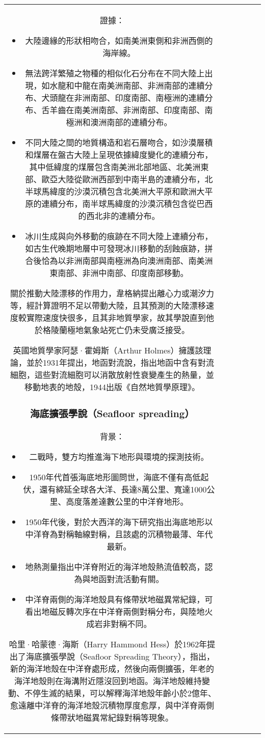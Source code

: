 \documentclass[a4paper,12pt]{report}
\begin{document}
\begin{tabular}{|c|c|c|c|c|c|}
證據：
\begin{itemize}
\item 大陸邊緣的形狀相吻合，如南美洲東側和非洲西側的海岸線。
\item 無法跨洋繁殖之物種的相似化石分布在不同大陸上出現，如水龍和中龍在南美洲南部、非洲南部的連續分布、犬頭龍在非洲南部、印度南部、南極洲的連續分布、舌羊齒在南美洲南部、非洲南部、印度南部、南極洲和澳洲南部的連續分布。
\item 不同大陸之間的地質構造和岩石層吻合，如沙漠層積和煤層在盤古大陸上呈現依據緯度變化的連續分布，其中低緯度的煤層包含南美洲北部地區、北美洲東部、歐亞大陸從歐洲西部到中南半島的連續分布，北半球馬緯度的沙漠沉積包含北美洲大平原和歐洲大平原的連續分布，南半球馬緯度的沙漠沉積包含從巴西的西北非的連續分布。
\item 冰川生成與向外移動的痕跡在不同大陸上連續分布，如古生代晚期地層中可發現冰川移動的刮蝕痕跡，拼合後恰為以非洲南部與南極洲為向澳洲南部、南美洲東南部、非洲中南部、印度南部移動。
\end{itemize}
關於推動大陸漂移的作用力，韋格納提出離心力或潮汐力等，經計算證明不足以帶動大陸，且其預測的大陸漂移速度較實際速度快很多，且其非地質學家，故其學說直到他於格陵蘭極地氣象站死亡仍未受廣泛接受。

英國地質學家阿瑟·霍姆斯（Arthur Holmes）擁護該理論，並於1931年提出，地函對流說，指出地函中含有對流細胞，這些對流細胞可以消散放射性衰變產生的熱量，並移動地表的地殼，1944出版《自然地質學原理》。
\subsubsection{海底擴張學說（Seafloor spreading）}
背景：
\begin{itemize}
\item 二戰時，雙方均推進海下地形與環境的探測技術。
\item 1950年代首張海底地形圖問世，海底不僅有高低起伏，還有綿延全球各大洋、長達8萬公里、寬達1000公里、高度落差達數公里的中洋脊地形。
\item 1950年代後，對於大西洋的海下研究指出海底地形以中洋脊為對稱軸線對稱，且該處的沉積物最薄、年代最新。
\item 地熱測量指出中洋脊附近的海洋地殼熱流值較高，認為與地函對流活動有關。
\item 中洋脊兩側的海洋地殼具有條帶狀地磁異常紀錄，可看出地磁反轉次序在中洋脊兩側對稱分布，與陸地火成岩非對稱不同。
\end{itemize}
哈里·哈蒙德·海斯（Harry Hammond Hess）於1962年提出了海底擴張學說（Seafloor Spreading Theory），指出，新的海洋地殼在中洋脊處形成，然後向兩側擴張，年老的海洋地殼則在海溝附近隱沒回到地函。海洋地殼維持變動、不停生滅的結果，可以解釋海洋地殼年齡小於2億年、愈遠離中洋脊的海洋地殼沉積物厚度愈厚，與中洋脊兩側條帶狀地磁異常紀錄對稱等現象。


\end{tabular}
\end{document}
